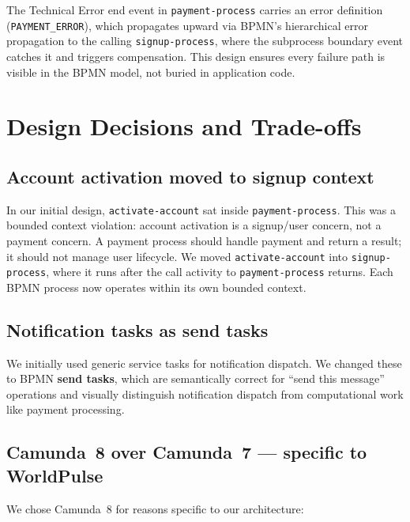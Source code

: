 \documentclass[10pt,a4paper]{article}
\begin{document}
The Technical Error end event in \texttt{payment-process} carries an error definition (\texttt{PAYMENT\_ERROR}), which propagates upward via BPMN's hierarchical error propagation to the calling \texttt{signup-process}, where the subprocess boundary event catches it and triggers compensation. This design ensures every failure path is visible in the BPMN model, not buried in application code.


\section{Design Decisions and Trade-offs}
\label{sec:decisions}

\subsection{Account activation moved to signup context}

In our initial design, \texttt{activate-account} sat inside \texttt{payment-process}. This was a bounded context violation: account activation is a signup/user concern, not a payment concern. A payment process should handle payment and return a result; it should not manage user lifecycle. We moved \texttt{activate-account} into \texttt{signup-process}, where it runs after the call activity to \texttt{payment-process} returns. Each BPMN process now operates within its own bounded context.

\subsection{Notification tasks as send tasks}

We initially used generic service tasks for notification dispatch. We changed these to BPMN \textbf{send tasks}, which are semantically correct for ``send this message'' operations and visually distinguish notification dispatch from computational work like payment processing.

\subsection{Camunda~8 over Camunda~7 --- specific to WorldPulse}

We chose Camunda~8 for reasons specific to our architecture:
\end{document}
